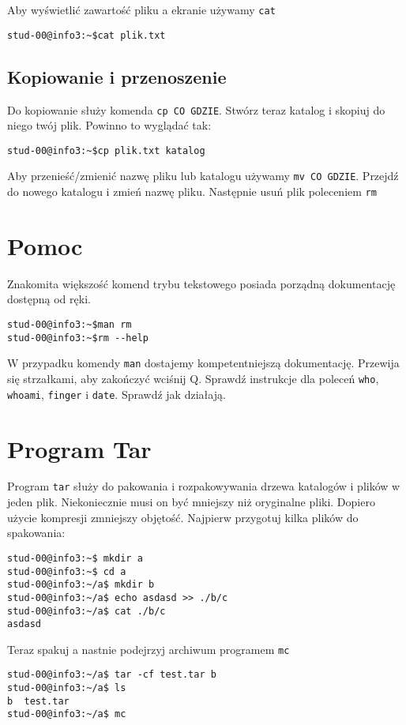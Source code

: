 \documentclass{instrukcja}
\begin{document}
Aby wyświetlić zawartość pliku a ekranie używamy {\tt cat}

\begin{verbatim}
stud-00@info3:~$cat plik.txt
\end{verbatim}

\subsection{Kopiowanie i przenoszenie}

Do kopiowanie służy komenda {\tt cp CO GDZIE}. Stwórz teraz katalog i skopiuj do niego twój plik. Powinno to wyglądać tak:
\begin{verbatim}
stud-00@info3:~$cp plik.txt katalog
\end{verbatim}

Aby przenieść/zmienić nazwę pliku lub katalogu używamy {\tt mv CO GDZIE}. Przejdź do nowego katalogu i zmień nazwę pliku. Następnie usuń plik poleceniem {\tt rm}

\section{Pomoc}
Znakomita większość komend trybu tekstowego posiada porządną dokumentację dostępną od ręki.
\begin{verbatim}
stud-00@info3:~$man rm
stud-00@info3:~$rm --help
\end{verbatim}
W przypadku komendy {\tt man} dostajemy kompetentniejszą dokumentację. Przewija się strzałkami, aby zakończyć wciśnij Q.
Sprawdź instrukcje dla poleceń {\tt who}, {\tt whoami}, {\tt finger} i  {\tt date}. Sprawdź jak działają.

\section{Program Tar}
Program {\tt tar} służy do pakowania i rozpakowywania drzewa katalogów i plików w jeden plik. Niekoniecznie musi on być mniejszy niż oryginalne pliki. Dopiero użycie kompresji zmniejszy objętość. Najpierw przygotuj kilka plików do spakowania:
\begin{verbatim}
stud-00@info3:~$ mkdir a
stud-00@info3:~$ cd a
stud-00@info3:~/a$ mkdir b
stud-00@info3:~/a$ echo asdasd >> ./b/c
stud-00@info3:~/a$ cat ./b/c
asdasd
\end{verbatim}

Teraz spakuj a nastnie podejrzyj archiwum programem {\tt mc}

\begin{verbatim}
stud-00@info3:~/a$ tar -cf test.tar b
stud-00@info3:~/a$ ls
b  test.tar
stud-00@info3:~/a$ mc
\end{verbatim}
\end{document}
